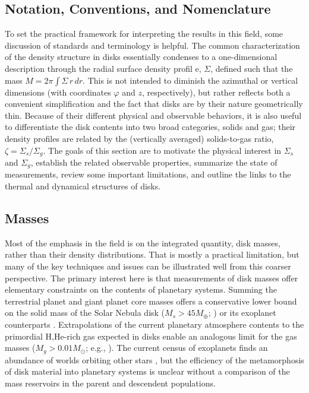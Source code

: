 \documentclass[a4paper]{ar-1col}
\begin{document}
\begin{textbox}[h]\section{Notation, Conventions, and Nomenclature}
To set the practical framework for interpreting the results in this field, some discussion of standards and terminology is helpful.  The common characterization of the density structure in disks essentially condenses to a one-dimensional description through the radial surface density profil  e, $\Sigma$, defined such that the mass $M = 2\pi \int \Sigma \, r \, dr$.  This is not intended to diminish the azimuthal or vertical dimensions (with coordinates $\varphi$ and $z$, respectively), but rather reflects both a convenient simplification and the fact that disks are by their nature geometrically thin.  Because of their different physical and observable behaviors, it is also useful to differentiate the disk contents into two broad categories, solids and gas; their density profiles are related by the (vertically averaged) solids-to-gas ratio, $\zeta = \Sigma_s / \Sigma_g$.  The goals of this section are to motivate the physical interest in $\Sigma_s$ and $\Sigma_g$, establish the related observable properties, summarize the state of measurements, review some important limitations, and outline the links to the thermal and dynamical structures of disks.  
\end{textbox}



\subsection{Masses} \label{sec:mass}

Most of the emphasis in the field is on the integrated quantity, disk masses, rather than their density distributions.  That is mostly a practical limitation, but many of the key techniques and issues can be illustrated well from this coarser perspective.  The primary interest here is that measurements of disk masses offer elementary constraints on the contents of planetary systems.  Summing the terrestrial planet and giant planet core masses offers a conservative lower bound on the solid mass of the Solar Nebula disk ($M_s > 45 M_\oplus$; \citealt{weidenschilling77}) or its exoplanet counterparts \citep[e.g.,][]{chiang13}.  Extrapolations of the current planetary atmosphere contents to the primordial H,He-rich gas expected in disks \citep[e.g.,][]{kusaka70} enable an analogous limit for the gas masses ($M_g > 0.01 M_\odot$; e.g., \citealt{hayashi81}).  The current census of exoplanets finds an abundance of worlds orbiting other stars \citep{howard10,dressing13}, but the efficiency of the metamorphosis of disk material into planetary systems is unclear without a comparison of the mass reservoirs in the parent and descendent populations.          
\end{document}
